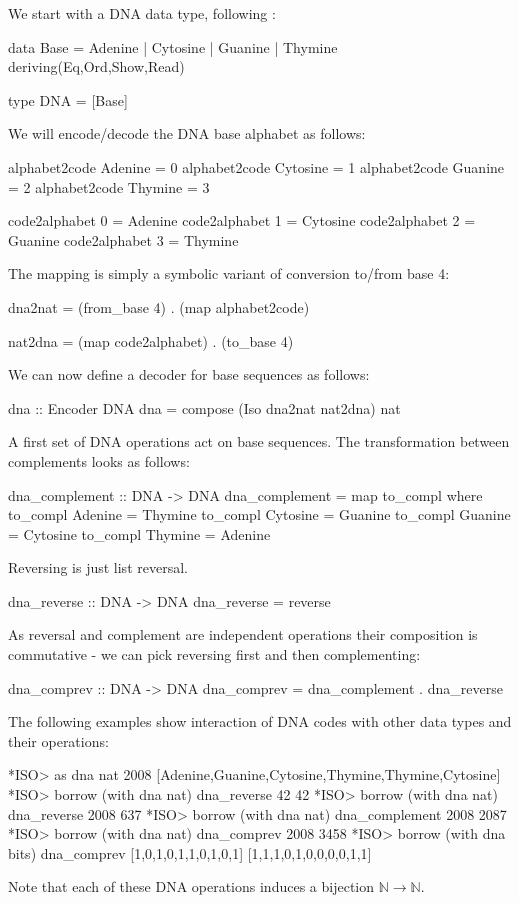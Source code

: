 \documentclass[]{INCLUDES/llncs}
\begin{document}
We start with a DNA data type, following \cite{algDNA,haskellDNA}:
\begin{code}
data Base = Adenine | Cytosine | Guanine | Thymine 
  deriving(Eq,Ord,Show,Read)

type DNA = [Base]
\end{code}
We will encode/decode the DNA base alphabet as follows:
\begin{code}
alphabet2code Adenine = 0
alphabet2code Cytosine = 1
alphabet2code Guanine = 2 
alphabet2code Thymine = 3

code2alphabet 0 = Adenine
code2alphabet 1 = Cytosine
code2alphabet 2 = Guanine 
code2alphabet 3 = Thymine
\end{code}
The mapping is simply a symbolic variant of conversion to/from base 4:
\begin{code}
dna2nat  = (from_base 4) . (map alphabet2code)

nat2dna = (map code2alphabet) . (to_base 4)
\end{code}
We can now define a decoder for base sequences as follows:
\begin{code}
dna :: Encoder DNA
dna = compose (Iso dna2nat nat2dna)  nat
\end{code}

A first set of DNA operations act on base sequences.
The transformation between complements looks as follows:  
\begin{code}
dna_complement :: DNA -> DNA
dna_complement = map to_compl where
  to_compl Adenine = Thymine
  to_compl Cytosine = Guanine
  to_compl Guanine = Cytosine
  to_compl Thymine = Adenine
\end{code}
Reversing is just list reversal.
\begin{code}
dna_reverse :: DNA -> DNA
dna_reverse = reverse
\end{code}
As reversal and complement are independent operations
their composition is commutative - we can pick
reversing first and then complementing:
\begin{code}
dna_comprev :: DNA -> DNA
dna_comprev = dna_complement . dna_reverse
\end{code}
The following examples show interaction of DNA codes
with other data types and their operations:
\begin{codex}
*ISO> as dna nat 2008
[Adenine,Guanine,Cytosine,Thymine,Thymine,Cytosine]
*ISO> borrow (with dna nat) dna_reverse 42
42
*ISO> borrow (with dna nat) dna_reverse 2008
637
*ISO> borrow (with dna nat) dna_complement 2008
2087
*ISO> borrow (with dna nat) dna_comprev 2008
3458
*ISO> borrow (with dna bits) 
        dna_comprev [1,0,1,0,1,1,0,1,0,1]
[1,1,1,0,1,0,0,0,0,1,1]
\end{codex}
Note that each of these DNA operations induces
a bijection $\mathbb{N} \rightarrow \mathbb{N}$.
\end{document}
